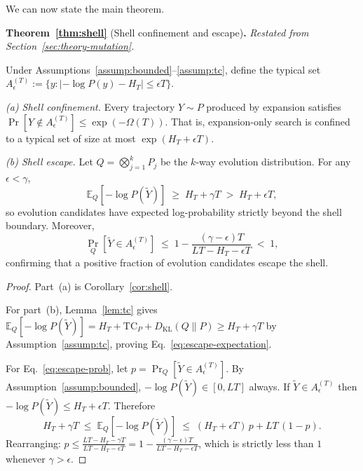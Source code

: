 We can now state the main theorem.


\noindent\textbf{Theorem~\ref{thm:shell}} (Shell confinement and escape)\textbf{.}
\textit{Restated from Section~\ref{sec:theory-mutation}.}
\medskip

\noindent Under Assumptions~\ref{assump:bounded}--\ref{assump:tc}, define the typical set $A_\epsilon^{(T)}:=\{y:|-\log P(y)-H_T|\le\epsilon T\}$.

\textit{(a) Shell confinement.} Every trajectory $Y \sim P$ produced by expansion satisfies $\Pr[Y \notin A_\epsilon^{(T)}] \leq \exp(-\Omega(T))$. That is, expansion-only search is confined to a typical set of size at most $\exp(H_T + \epsilon T)$.

\textit{(b) Shell escape.} Let $Q = \bigotimes_{j=1}^k P_j$ be the $k$-way evolution distribution. For any $\epsilon < \gamma$,
\begin{equation*}
  \mathbb{E}_Q[-\log P(\widetilde{Y})] \;\geq\; H_T + \gamma T \;>\; H_T + \epsilon T,
\end{equation*}
so evolution candidates have expected log-probability strictly beyond the shell boundary. Moreover,
\begin{equation*}
  \Pr_Q\!\left[\widetilde{Y} \in A_\epsilon^{(T)}\right] \;\leq\; 1 - \frac{(\gamma - \epsilon)T}{LT - H_T - \epsilon T} \;<\; 1,
\end{equation*}
confirming that a positive fraction of evolution candidates escape the shell.


\begin{proof}
Part~(a) is Corollary~\ref{cor:shell}.

For part~(b), Lemma~\ref{lem:tc} gives $\mathbb{E}_Q[-\log P(\widetilde{Y})] = H_T + \mathrm{TC}_P + D_{\mathrm{KL}}(Q \| P) \geq H_T + \gamma T$ by Assumption~\ref{assump:tc}, proving Eq.~\eqref{eq:escape-expectation}.

For Eq.~\eqref{eq:escape-prob}, let $p = \Pr_Q[\widetilde{Y} \in A_\epsilon^{(T)}]$. By Assumption~\ref{assump:bounded}, $-\log P(\widetilde{Y}) \in [0, LT]$ always. If $\widetilde{Y} \in A_\epsilon^{(T)}$ then $-\log P(\widetilde{Y}) \leq H_T + \epsilon T$. Therefore
\begin{equation}
  H_T + \gamma T \;\leq\; \mathbb{E}_Q[-\log P(\widetilde{Y})] \;\leq\; (H_T + \epsilon T)\,p + LT\,(1 - p).
\end{equation}
Rearranging: $p \leq \frac{LT - H_T - \gamma T}{LT - H_T - \epsilon T} = 1 - \frac{(\gamma - \epsilon)T}{LT - H_T - \epsilon T}$, which is strictly less than $1$ whenever $\gamma > \epsilon$.
\end{proof}

